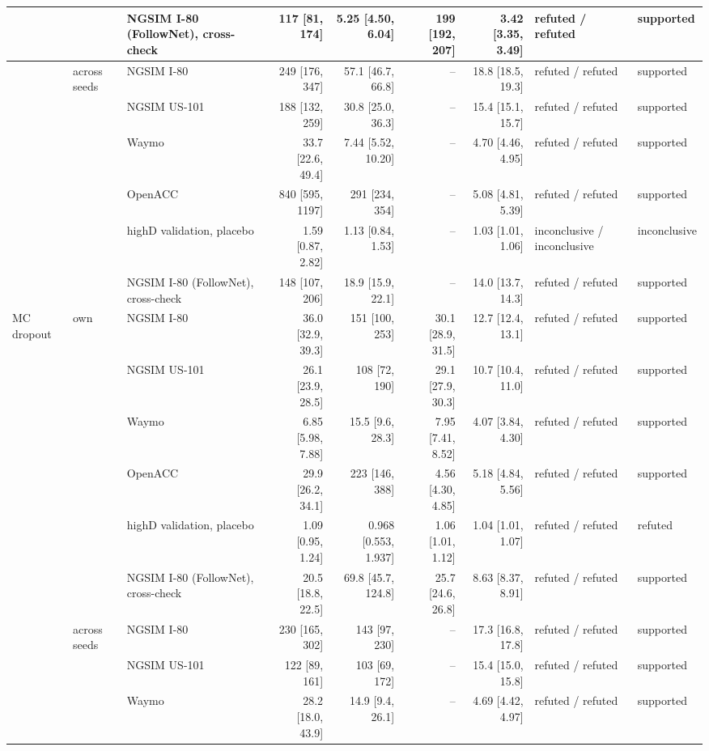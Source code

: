 \begin{longtable}{lllrrrrll}
 &  & NGSIM I-80 (FollowNet), cross-check & 117 [81, 174] & 5.25 [4.50, 6.04] & 199 [192, 207] & 3.42 [3.35, 3.49] & refuted / refuted & supported \\
\midrule
 & across seeds & NGSIM I-80 & 249 [176, 347] & 57.1 [46.7, 66.8] & -- & 18.8 [18.5, 19.3] & refuted / refuted & supported \\
 &  & NGSIM US-101 & 188 [132, 259] & 30.8 [25.0, 36.3] & -- & 15.4 [15.1, 15.7] & refuted / refuted & supported \\
 &  & Waymo & 33.7 [22.6, 49.4] & 7.44 [5.52, 10.20] & -- & 4.70 [4.46, 4.95] & refuted / refuted & supported \\
 &  & OpenACC & 840 [595, 1197] & 291 [234, 354] & -- & 5.08 [4.81, 5.39] & refuted / refuted & supported \\
 &  & highD validation, placebo & 1.59 [0.87, 2.82] & 1.13 [0.84, 1.53] & -- & 1.03 [1.01, 1.06] & inconclusive / inconclusive & inconclusive \\
 &  & NGSIM I-80 (FollowNet), cross-check & 148 [107, 206] & 18.9 [15.9, 22.1] & -- & 14.0 [13.7, 14.3] & refuted / refuted & supported \\
\midrule
MC dropout & own & NGSIM I-80 & 36.0 [32.9, 39.3] & 151 [100, 253] & 30.1 [28.9, 31.5] & 12.7 [12.4, 13.1] & refuted / refuted & supported \\
 &  & NGSIM US-101 & 26.1 [23.9, 28.5] & 108 [72, 190] & 29.1 [27.9, 30.3] & 10.7 [10.4, 11.0] & refuted / refuted & supported \\
 &  & Waymo & 6.85 [5.98, 7.88] & 15.5 [9.6, 28.3] & 7.95 [7.41, 8.52] & 4.07 [3.84, 4.30] & refuted / refuted & supported \\
 &  & OpenACC & 29.9 [26.2, 34.1] & 223 [146, 388] & 4.56 [4.30, 4.85] & 5.18 [4.84, 5.56] & refuted / refuted & supported \\
 &  & highD validation, placebo & 1.09 [0.95, 1.24] & 0.968 [0.553, 1.937] & 1.06 [1.01, 1.12] & 1.04 [1.01, 1.07] & refuted / refuted & refuted \\
 &  & NGSIM I-80 (FollowNet), cross-check & 20.5 [18.8, 22.5] & 69.8 [45.7, 124.8] & 25.7 [24.6, 26.8] & 8.63 [8.37, 8.91] & refuted / refuted & supported \\
\midrule
 & across seeds & NGSIM I-80 & 230 [165, 302] & 143 [97, 230] & -- & 17.3 [16.8, 17.8] & refuted / refuted & supported \\
 &  & NGSIM US-101 & 122 [89, 161] & 103 [69, 172] & -- & 15.4 [15.0, 15.8] & refuted / refuted & supported \\
 &  & Waymo & 28.2 [18.0, 43.9] & 14.9 [9.4, 26.1] & -- & 4.69 [4.42, 4.97] & refuted / refuted & supported \\

\end{longtable}

